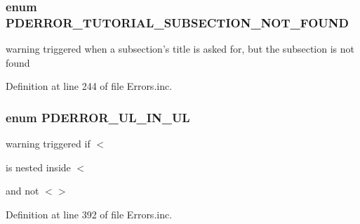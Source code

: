\hypertarget{_errors_8inc_a982f4da3034cc78c02c12309cde3a5b6}{
\subsubsection[{\-P\-D\-E\-R\-R\-O\-R\-\_\-\-T\-U\-T\-O\-R\-I\-A\-L\-\_\-\-S\-U\-B\-S\-E\-C\-T\-I\-O\-N\-\_\-\-N\-O\-T\-\_\-\-F\-O\-U\-N\-D}]{\setlength{\rightskip}{0pt plus 5cm}enum {\bf \-P\-D\-E\-R\-R\-O\-R\-\_\-\-T\-U\-T\-O\-R\-I\-A\-L\-\_\-\-S\-U\-B\-S\-E\-C\-T\-I\-O\-N\-\_\-\-N\-O\-T\-\_\-\-F\-O\-U\-N\-D}}}\label{_errors_8inc_a982f4da3034cc78c02c12309cde3a5b6}
warning triggered when a subsection's title is asked for, but the subsection is not found 

\-Definition at line 244 of file \-Errors.\-inc.

\hypertarget{_errors_8inc_aa2f7a55be23200c0f3526550596a5ea7}{
\subsubsection[{\-P\-D\-E\-R\-R\-O\-R\-\_\-\-U\-L\-\_\-\-I\-N\-\_\-\-U\-L}]{\setlength{\rightskip}{0pt plus 5cm}enum {\bf \-P\-D\-E\-R\-R\-O\-R\-\_\-\-U\-L\-\_\-\-I\-N\-\_\-\-U\-L}}}\label{_errors_8inc_aa2f7a55be23200c0f3526550596a5ea7}
warning triggered if $<$
\begin{DoxyItemize}
\end{DoxyItemize}is nested inside $<$
\begin{DoxyItemize}
\end{DoxyItemize}and not $<$$>$ 

\-Definition at line 392 of file \-Errors.\-inc.

